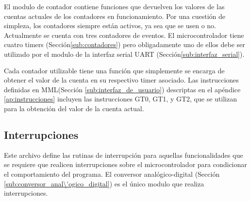 El modulo de contador contiene funciones que devuelven los valores de las cuentas actuales de los contadores en funcionamiento. Por una cuesti\'on de simpleza, los contadores siempre est\'an activos, ya sea que se usen o no. Actualmente se cuenta con tres contadores de eventos. El microcontrolador tiene cuatro timers (Secci\'on\ref{sub:contadores}) pero obligadamente uno de ellos debe ser utilizado por el modulo de la interfaz serial UART (Secci\'on\ref{sub:interfaz_serial}).

Cada contador utilizable tiene una funci\'on que simplemente se encarga de obtener el valor de la cuenta en su respectivo timer asociado. Las instrucciones definidas en MML(Secci\'on \ref{sub:interfaz_de_usuario}) descriptas en el ap\'endice \ref{ap:instrucciones} incluyen las instrucciones GT0, GT1, y GT2, que se utilizan para la obtenci\'on del valor de la cuenta actual.

\subsection{Interrupciones} %
\label{sub:interrupciones}

Este archivo define las rutinas de interrupci\'on para aquellas funcionalidades que se requiere que realicen interrupciones sobre el microcontrolador para condicionar el comportamiento del programa. El conversor anal\'ogico-digital (Secci\'on \ref{sub:conversor_anal\'ogico_digital}) es el \'unico modulo que realiza interrupciones.


\clearpage

